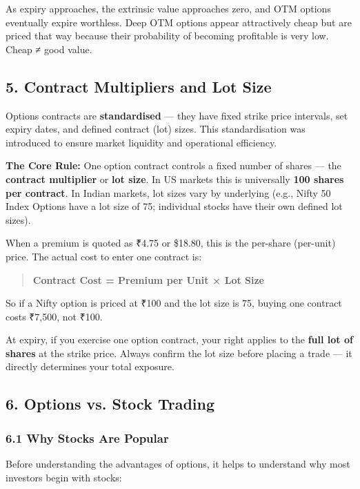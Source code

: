 \documentclass[12pt,openany]{book}
\begin{document}
As expiry approaches, the extrinsic value approaches zero, and OTM options eventually expire worthless. Deep OTM options appear attractively cheap but are priced that way because their probability of becoming profitable is very low. Cheap ≠ good value.


\subsection{5. Contract Multipliers and Lot Size}

Options contracts are \textbf{standardised} — they have fixed strike price intervals, set expiry dates, and defined contract (lot) sizes. This standardisation was introduced to ensure market liquidity and operational efficiency.

\textbf{The Core Rule:} One option contract controls a fixed number of shares — the \textbf{contract multiplier} or \textbf{lot size}. In US markets this is universally \textbf{100 shares per contract}. In Indian markets, lot sizes vary by underlying (e.g., Nifty 50 Index Options have a lot size of 75; individual stocks have their own defined lot sizes).

When a premium is quoted as ₹4.75 or \$18.80, this is the per-share (per-unit) price. The actual cost to enter one contract is:

\begin{quote}
\textbf{Contract Cost = Premium per Unit × Lot Size}
\end{quote}

So if a Nifty option is priced at ₹100 and the lot size is 75, buying one contract costs ₹7,500, not ₹100.

At expiry, if you exercise one option contract, your right applies to the \textbf{full lot of shares} at the strike price. Always confirm the lot size before placing a trade — it directly determines your total exposure.


\subsection{6. Options vs. Stock Trading}

\subsubsection{6.1 Why Stocks Are Popular}

Before understanding the advantages of options, it helps to understand why most investors begin with stocks:
\end{document}
